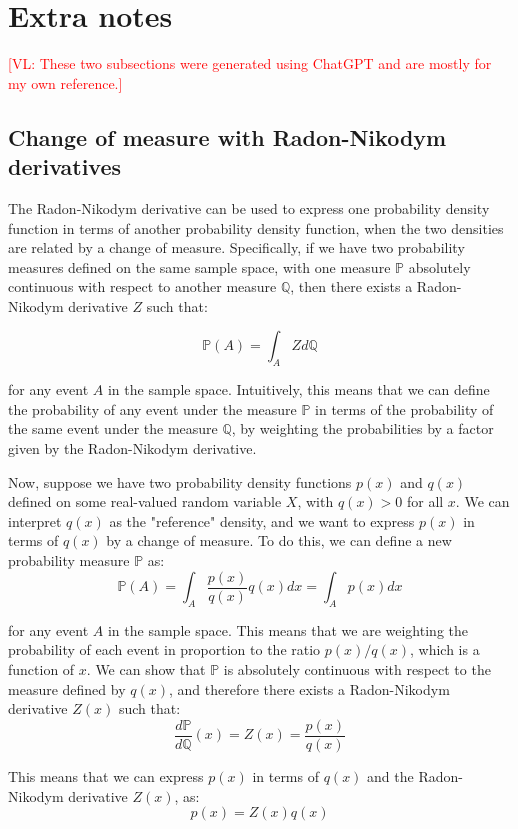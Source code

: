 \documentclass{article}
\newcommand{\vl}[1]{\textcolor{red}{[VL: #1]}}
\begin{document}
	\section{Extra notes}
	
	\vl{These two subsections were generated using ChatGPT and are mostly for my own reference.}
	
	\subsection{Change of measure with Radon-Nikodym derivatives}
	\label{sec:change_of_measure}
	
	The Radon-Nikodym derivative can be used to express one probability density function in terms of another probability density function, when the two densities are related by a change of measure. Specifically, if we have two probability measures defined on the same sample space, with one measure $\mathbb{P}$ absolutely continuous with respect to another measure $\mathbb{Q}$, then there exists a Radon-Nikodym derivative $Z$ such that:
	
	$$\mathbb{P}(A) = \int_A Z d\mathbb{Q}$$
	
	for any event $A$ in the sample space. Intuitively, this means that we can define the probability of any event under the measure $\mathbb{P}$ in terms of the probability of the same event under the measure $\mathbb{Q}$, by weighting the probabilities by a factor given by the Radon-Nikodym derivative.
	
	Now, suppose we have two probability density functions $p(x)$ and $q(x)$ defined on some real-valued random variable $X$, with $q(x)>0$ for all $x$. We can interpret $q(x)$ as the "reference" density, and we want to express $p(x)$ in terms of $q(x)$ by a change of measure. To do this, we can define a new probability measure $\mathbb{P}$ as:
	$$\mathbb{P}(A) = \int_A \frac{p(x)}{q(x)} q(x) dx = \int_A p(x) dx$$
	
	for any event $A$ in the sample space. This means that we are weighting the probability of each event in proportion to the ratio $p(x)/q(x)$, which is a function of $x$. We can show that $\mathbb{P}$ is absolutely continuous with respect to the measure defined by $q(x)$, and therefore there exists a Radon-Nikodym derivative $Z(x)$ such that:
	$$\frac{d\mathbb{P}}{d\mathbb{Q}}(x) = Z(x) = \frac{p(x)}{q(x)}$$
	
	This means that we can express $p(x)$ in terms of $q(x)$ and the Radon-Nikodym derivative $Z(x)$, as:
	$$p(x) = Z(x) q(x)$$
	
\end{document}

